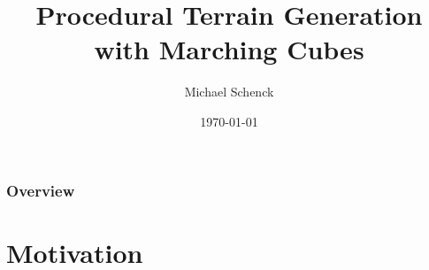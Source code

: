 \documentclass[12pt]{beamer}
\title[Procedural Terrain Generation]{Procedural Terrain Generation with Marching Cubes} %
\author{Michael Schenck} %
\date{\today} %
\begin{document}
\begin{frame}
    \titlepage %
\end{frame}

\begin{frame}
    \frametitle{Overview} %
    \tableofcontents %
\end{frame}


\section{Motivation} %

\subsection{} %
\end{document}
